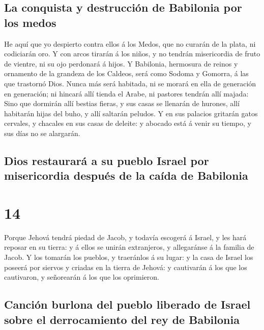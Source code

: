 \hypertarget{la-conquista-y-destrucciuxf3n-de-babilonia-por-los-medos}{%
\subsection{La conquista y destrucción de Babilonia por los
medos}\label{la-conquista-y-destrucciuxf3n-de-babilonia-por-los-medos}}

 He aquí que yo despierto contra ellos á los Medos, que no
curarán de la plata, ni codiciarán oro.  Y con arcos
tirarán á los niños, y no tendrán misericordia de fruto de vientre, ni
su ojo perdonará á hijos.  Y Babilonia, hermosura de reinos
y ornamento de la grandeza de los Caldeos, será como Sodoma y Gomorra, á
las que trastornó Dios.  Nunca más será habitada, ni se
morará en ella de generación en generación; ni hincará allí tienda el
Arabe, ni pastores tendrán allí majada:  Sino que dormirán
allí bestias fieras, y sus casas se llenarán de hurones, allí habitarán
hijas del buho, y allí saltarán peludos.  Y en sus palacios
gritarán gatos cervales, y chacales en sus casas de deleite: y abocado
está á venir su tiempo, y sus días no se alargarán.

\hypertarget{dios-restauraruxe1-a-su-pueblo-israel-por-misericordia-despuuxe9s-de-la-cauxedda-de-babilonia}{%
\subsection{Dios restaurará a su pueblo Israel por misericordia después
de la caída de
Babilonia}\label{dios-restauraruxe1-a-su-pueblo-israel-por-misericordia-despuuxe9s-de-la-cauxedda-de-babilonia}}

\hypertarget{section-13}{%
\section{14}\label{section-13}}

 Porque Jehová tendrá piedad de Jacob, y todavía escogerá á
Israel, y les hará reposar en su tierra: y á ellos se unirán
extranjeros, y allegaránse á la familia de Jacob.  Y los
tomarán los pueblos, y traeránlos á su lugar: y la casa de Israel los
poseerá por siervos y criadas en la tierra de Jehová: y cautivarán á los
que los cautivaron, y señorearán á los que los oprimieron.

\hypertarget{canciuxf3n-burlona-del-pueblo-liberado-de-israel-sobre-el-derrocamiento-del-rey-de-babilonia}{%
\subsection{Canción burlona del pueblo liberado de Israel sobre el
derrocamiento del rey de
Babilonia}\label{canciuxf3n-burlona-del-pueblo-liberado-de-israel-sobre-el-derrocamiento-del-rey-de-babilonia}}

